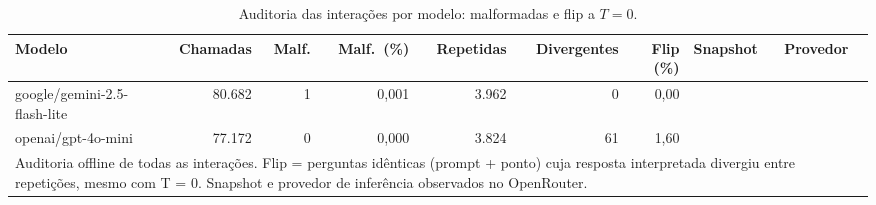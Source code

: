 \begin{table}[htbp]
\centering
\small
\caption{Auditoria das interações por modelo: malformadas e flip a $T=0$.}
\label{tab:auditoria_por_modelo}
\begin{tabular}{lrrrrrrll}
\toprule
Modelo & Chamadas & Malf. & Malf.\ (\%) & Repetidas & Divergentes & Flip (\%) & Snapshot & Provedor \\
\midrule
google/gemini-2.5-flash-lite & 80.682 & 1 & 0,001 & 3.962 & 0 & 0,00 &  &  \\
openai/gpt-4o-mini & 77.172 & 0 & 0,000 & 3.824 & 61 & 1,60 &  &  \\
\bottomrule
\multicolumn{9}{p{0.95\linewidth}}{\footnotesize Auditoria offline de todas as interações. Flip = perguntas idênticas (prompt + ponto) cuja resposta interpretada divergiu entre repetições, mesmo com T = 0. Snapshot e provedor de inferência observados no OpenRouter.} \\
\end{tabular}
\end{table}

